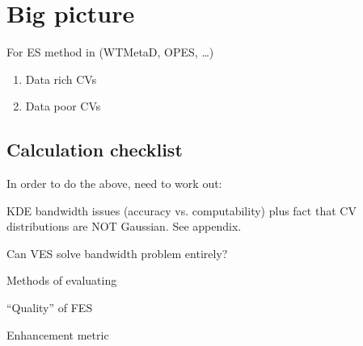 \section{Big picture}
For ES method in (WTMetaD, OPES, \ldots)
\begin{enumerate}
    \item Data rich CVs
    \item Data poor CVs
\end{enumerate}

\subsection{Calculation checklist}
In order to do the above, need to work out:
\begin{enumeratec}
    \item KDE bandwidth issues (accuracy vs. computability) plus fact that CV distributions are NOT Gaussian.  See appendix.
    \item Can VES solve bandwidth problem entirely?
    \item Methods of evaluating
    \begin{itemizec}
        \item ``Quality'' of FES
        \item Enhancement metric
    \end{itemizec}
\end{enumeratec}

